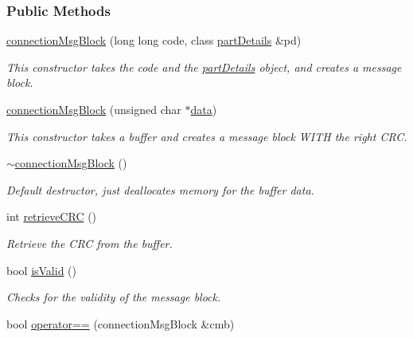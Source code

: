 \subsubsection*{Public Methods}
\begin{CompactItemize}
\item 
\hyperlink{classconnectionMsgBlock_connectionMsgBlocka0}{connection\-Msg\-Block} (long long code, class \hyperlink{classpartDetails}{part\-Details} \&pd)
\begin{CompactList}\small\item\em This constructor takes the code and the \hyperlink{classpartDetails}{part\-Details} object, and creates a message block.\item\end{CompactList}\item 
\hyperlink{classconnectionMsgBlock_connectionMsgBlocka1}{connection\-Msg\-Block} (unsigned char $\ast$\hyperlink{classconnectionMsgBlock_connectionMsgBlocko1}{data})
\begin{CompactList}\small\item\em This constructor takes a buffer and creates a message block WITH the right CRC.\item\end{CompactList}\item 
\hyperlink{classconnectionMsgBlock_connectionMsgBlocka2}{$\sim$connection\-Msg\-Block} ()
\begin{CompactList}\small\item\em Default destructor, just deallocates memory for the buffer data.\item\end{CompactList}\item 
int \hyperlink{classconnectionMsgBlock_connectionMsgBlocka3}{retrieve\-CRC} ()
\begin{CompactList}\small\item\em Retrieve the CRC from the buffer.\item\end{CompactList}\item 
bool \hyperlink{classconnectionMsgBlock_connectionMsgBlocka4}{is\-Valid} ()
\begin{CompactList}\small\item\em Checks for the validity of the message block.\item\end{CompactList}\item 
bool \hyperlink{classconnectionMsgBlock_connectionMsgBlocka5}{operator==} (connection\-Msg\-Block \&cmb)

\end{CompactItemize}
